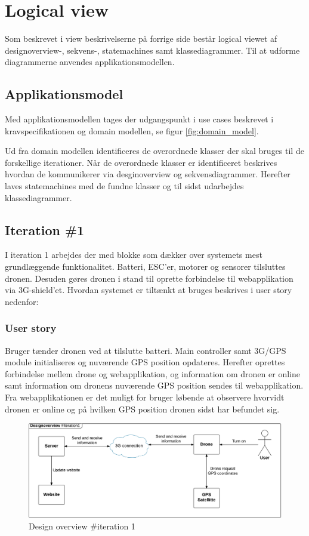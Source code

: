 \section{Logical view}

Som beskrevet i view beskrivelserne på forrige side består logical viewet af designoverview-, sekvens-, statemachines samt klassediagrammer. Til at udforme diagrammerne anvendes applikationsmodellen.

\subsection{Applikationsmodel}
Med applikationsmodellen tages der udgangspunkt i use cases beskrevet i kravspecifikationen og domain modellen, se figur \ref{fig:domain_model}.
  
Ud fra domain modellen identificeres de overordnede klasser der skal bruges til de forskellige iterationer. Når de overordnede klasser er identificeret beskrives hvordan de kommunikerer via desginoverview og sekvensdiagrammer. Herefter laves statemachines med de fundne klasser og til sidst udarbejdes klassediagrammer.


\subsection{Iteration \#1}
I iteration 1 arbejdes der med blokke som dækker over systemets mest grundlæggende funktionalitet. Batteri,
ESC’er, motorer og sensorer tilsluttes dronen. Desuden gøres dronen i stand til oprette forbindelse til webapplikation via 3G-shield’et. Hvordan systemet er tiltænkt at bruges beskrives i user story nedenfor:

\subsubsection*{User story}
Bruger tænder dronen ved at tilslutte batteri. Main controller samt 3G/GPS module initialiseres og nuværende GPS position opdateres. Herefter oprettes forbindelse mellem drone og webapplikation, og information om dronen er online samt information om dronens nuværende GPS position sendes til webapplikation. Fra webapplikationen er det muligt for bruger løbende at observere hvorvidt dronen er online og på hvilken GPS position dronen sidst har befundet sig.

\begin{figure}[H]
	\centering
	\includegraphics[width=1\textwidth]{Billeder/design_overview/design_overview_iteration1.png}
	\vspace{-.5cm}
	\caption{Design overview \#iteration 1}
	\label{fig:design_overview_UC1}
\end{figure}


